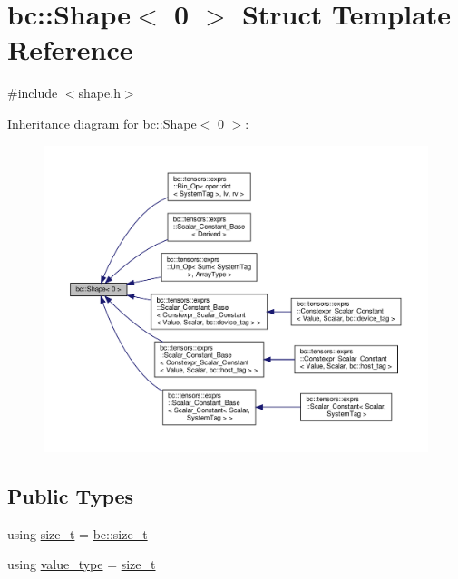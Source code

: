\hypertarget{structbc_1_1Shape_3_010_01_4}{}\section{bc\+:\+:Shape$<$ 0 $>$ Struct Template Reference}
\label{structbc_1_1Shape_3_010_01_4}


{\ttfamily \#include $<$shape.\+h$>$}



Inheritance diagram for bc\+:\+:Shape$<$ 0 $>$\+:\nopagebreak
\begin{figure}[H]
\begin{center}
\leavevmode
\includegraphics[width=350pt]{structbc_1_1Shape_3_010_01_4__inherit__graph}
\end{center}
\end{figure}
\subsection*{Public Types}
\begin{DoxyCompactItemize}
\item 
using \hyperlink{structbc_1_1Shape_3_010_01_4_a7bf4db55cfc575f40871044048ea5c03}{size\+\_\+t} = \hyperlink{namespacebc_aaf8e3fbf99b04b1b57c4f80c6f55d3c5}{bc\+::size\+\_\+t}
\item 
using \hyperlink{structbc_1_1Shape_3_010_01_4_a342cb50fc2de91d730a07750321bf986}{value\+\_\+type} = \hyperlink{structbc_1_1Shape_3_010_01_4_a7bf4db55cfc575f40871044048ea5c03}{size\+\_\+t}
\end{DoxyCompactItemize}
